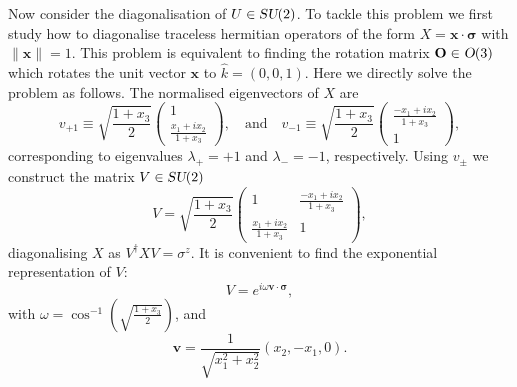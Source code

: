 \documentclass[12pt]{amsart}
\def\su2{\textsl{SU}(2)}
\def\o3{\textsl{O}(3)}
\theoremstyle{definition}
\theoremstyle{remark}
\numberwithin{equation}{section}
\begin{document}
Now consider the diagonalisation of $U\in \su2$. To tackle this problem we first study how to diagonalise traceless hermitian operators of the form $X = \mathbf{x}\cdot\boldsymbol{\sigma}$ with $\|\mathbf{x}\|=1$. This problem is equivalent to finding the rotation matrix $\mathbf{O}\in \o3$ which rotates the unit vector $\mathbf{x}$ to $\widehat{k} = (0,0,1)$. Here we directly solve the problem as follows. The normalised eigenvectors of $X$ are 
\begin{equation}
	v_{+1} \equiv \sqrt{\frac{1+x_3}{2}}\begin{pmatrix} 1 \\ \frac{x_1+ix_2}{1+x_3}\end{pmatrix}, \quad \text{and}\quad v_{-1} \equiv \sqrt{\frac{1+x_3}{2}}\begin{pmatrix}  \frac{-x_1+ix_2}{1+x_3} \\ 1\end{pmatrix},
\end{equation}
corresponding to eigenvalues $\lambda_+=+1$ and $\lambda_- = -1$, respectively. Using $v_\pm$ we construct the matrix $V\in\su2$
\begin{equation}
	V = \sqrt{\frac{1+x_3}{2}}\begin{pmatrix} 1 & \frac{-x_1+ix_2}{1+x_3}\\ \frac{x_1+ix_2}{1+x_3} & 1\end{pmatrix},
\end{equation}
diagonalising $X$ as $V^\dag X V = \sigma^z$. It is convenient to find the exponential representation of $V$:
\begin{equation}
	V = e^{i \omega\mathbf{v}\cdot\boldsymbol{\sigma}},
\end{equation} 
with $\omega = \cos^{-1}\left(\sqrt{\frac{1+x_3}{2}}\right)$, and
\begin{equation}
	\mathbf{v} = \frac{1}{\sqrt{x_1^2 + x_2^2}} (x_2, -x_1, 0).
\end{equation}
\end{document}
